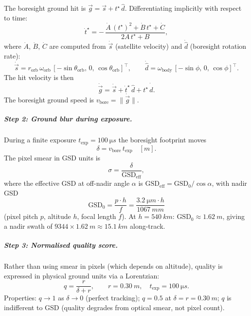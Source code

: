 The boresight ground hit is $\vec{g} = \vec{s} + t^\star\,\hat{d}$.
Differentiating implicitly with respect to time:
\begin{equation}
  \dot t^\star = -\,\frac{\dot A\,(t^\star)^2 + \dot B\,t^\star + \dot C}{2A\,t^\star + B},
  \label{eq:tdot}
\end{equation}
where $\dot A$, $\dot B$, $\dot C$ are computed from $\dot{\vec{s}}$ (satellite velocity) and
$\dot{\hat{d}}$ (boresight rotation rate):
\begin{equation}
  \dot{\vec{s}} = r_\text{orb}\,\omega_\text{orb}\,[-\sin\theta_\text{orb},\,0,\,\cos\theta_\text{orb}]^\top,
  \qquad
  \dot{\hat{d}} = \omega_\text{body}\,[-\sin\phi,\,0,\,\cos\phi]^\top.
\end{equation}
The hit velocity is then
\begin{equation}
  \dot{\vec{g}} = \dot{\vec{s}} + \dot t^\star\,\hat{d} + t^\star\,\dot{\hat{d}}.
  \label{eq:gdot}
\end{equation}
The boresight ground speed is $v_\text{bore} = \|\dot{\vec{g}}\|$.

\subparagraph{Step 2: Ground blur during exposure.}
During a finite exposure $t_\text{exp} = \SI{100}{\micro s}$ the boresight footprint moves
\begin{equation}
  \delta = v_\text{bore}\,t_\text{exp}\quad[\si{m}].
\end{equation}
The pixel smear in GSD units is
\begin{equation}
  \sigma = \frac{\delta}{\text{GSD}_\text{eff}},
\end{equation}
where the effective GSD at off-nadir angle $\alpha$ is
$\text{GSD}_\text{eff} = \text{GSD}_0 / \cos\alpha$,
with nadir GSD
\begin{equation}
  \text{GSD}_0 = \frac{p\cdot h}{f} = \frac{\SI{3.2}{\micro m}\cdot h}{\SI{1067}{mm}}
\end{equation}
(pixel pitch $p$, altitude $h$, focal length $f$).
At $h = \SI{540}{km}$: $\text{GSD}_0 \approx \SI{1.62}{m}$,
giving a nadir swath of $9344 \times \SI{1.62}{m} \approx \SI{15.1}{km}$ along-track.

\subparagraph{Step 3: Normalised quality score.}
Rather than using smear in pixels (which depends on altitude), quality is expressed in physical
ground units via a Lorentzian:
\begin{equation}
  q = \frac{r}{\delta + r}, \qquad
  r = \SI{0.30}{m},\quad t_\text{exp} = \SI{100}{\micro s}.
  \label{eq:quality}
\end{equation}
Properties: $q \to 1$ as $\delta \to 0$ (perfect tracking); $q = 0.5$ at $\delta = r = \SI{0.30}{m}$;
$q$ is indifferent to GSD (quality degrades from optical smear, not pixel count).

